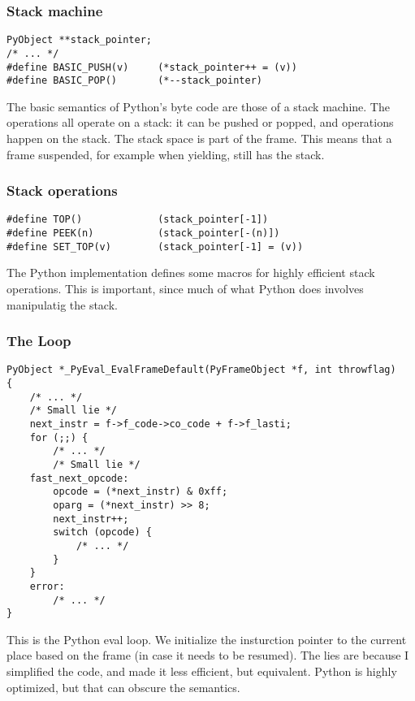 \begin{frame}[fragile]
\frametitle{Stack machine}

\begin{lstlisting}
PyObject **stack_pointer;
/* ... */
#define BASIC_PUSH(v)     (*stack_pointer++ = (v))
#define BASIC_POP()       (*--stack_pointer)
\end{lstlisting}
\end{frame}

The basic semantics of Python's byte code are those of a stack machine.
The operations all operate on a stack:
it can be pushed or popped,
and operations happen on the stack.
The stack space is part of the frame.
This means that a frame suspended,
for example when yielding,
still has the stack.

\begin{frame}[fragile]
\frametitle{Stack operations}

\begin{lstlisting}
#define TOP()             (stack_pointer[-1])
#define PEEK(n)           (stack_pointer[-(n)])
#define SET_TOP(v)        (stack_pointer[-1] = (v))
\end{lstlisting}
\end{frame}

The Python implementation defines some macros for highly
efficient stack operations. This is important,
since much of what Python does involves manipulatig the
stack.

\begin{frame}[fragile]
\frametitle{The Loop}

\begin{lstlisting}
PyObject *_PyEval_EvalFrameDefault(PyFrameObject *f, int throwflag)
{
    /* ... */
    /* Small lie */
    next_instr = f->f_code->co_code + f->f_lasti;
    for (;;) {
        /* ... */
        /* Small lie */
    fast_next_opcode:
        opcode = (*next_instr) & 0xff;
        oparg = (*next_instr) >> 8;
        next_instr++;
        switch (opcode) {
            /* ... */
        }
    }
    error:
        /* ... */
}
\end{lstlisting}
\end{frame}

This is the Python eval loop.
We initialize the insturction pointer to the current place based
on the frame
(in case it needs to be resumed).
The lies are because I simplified the code, and made it less efficient,
but equivalent. Python is highly optimized, but that can obscure
the semantics.


